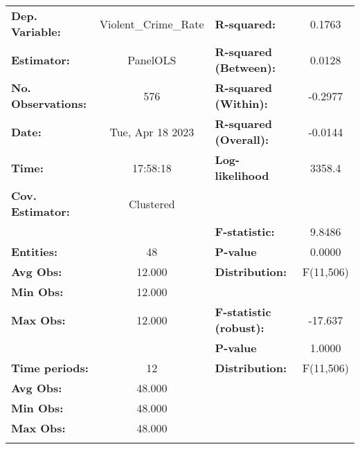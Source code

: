 \begin{center}
\begin{tabular}{lclc}
\toprule
\textbf{Dep. Variable:}           & Violent\_Crime\_Rate & \textbf{  R-squared:         }   &      0.1763      \\
\textbf{Estimator:}               &       PanelOLS       & \textbf{  R-squared (Between):}  &      0.0128      \\
\textbf{No. Observations:}        &         576          & \textbf{  R-squared (Within):}   &     -0.2977      \\
\textbf{Date:}                    &   Tue, Apr 18 2023   & \textbf{  R-squared (Overall):}  &     -0.0144      \\
\textbf{Time:}                    &       17:58:18       & \textbf{  Log-likelihood     }   &      3358.4      \\
\textbf{Cov. Estimator:}          &      Clustered       & \textbf{                     }   &                  \\
\textbf{}                         &                      & \textbf{  F-statistic:       }   &      9.8486      \\
\textbf{Entities:}                &          48          & \textbf{  P-value            }   &      0.0000      \\
\textbf{Avg Obs:}                 &        12.000        & \textbf{  Distribution:      }   &    F(11,506)     \\
\textbf{Min Obs:}                 &        12.000        & \textbf{                     }   &                  \\
\textbf{Max Obs:}                 &        12.000        & \textbf{  F-statistic (robust):} &     -17.637      \\
\textbf{}                         &                      & \textbf{  P-value            }   &      1.0000      \\
\textbf{Time periods:}            &          12          & \textbf{  Distribution:      }   &    F(11,506)     \\
\textbf{Avg Obs:}                 &        48.000        & \textbf{                     }   &                  \\
\textbf{Min Obs:}                 &        48.000        & \textbf{                     }   &                  \\
\textbf{Max Obs:}                 &        48.000        & \textbf{                     }   &                  \\
\textbf{}                         &                      & \textbf{                     }   &                  \\

\end{tabular}
\end{center}
